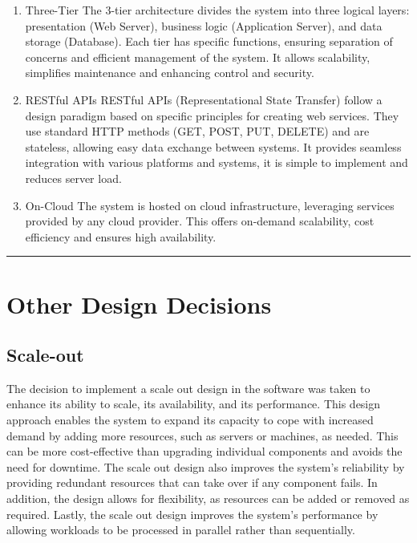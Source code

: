 \documentclass{Configuration_Files/Template}
\begin{document}
\begin{enumerate}
    \item \textcolor{bluepoli}{Three-Tier} The 3-tier architecture divides the system into three logical layers: presentation (Web Server), business logic (Application Server), and data storage (Database). Each tier has specific functions, ensuring separation of concerns and efficient management of the system. It allows scalability, simplifies maintenance and enhancing control and security. 
    \item \textcolor{bluepoli}{RESTful APIs} RESTful APIs (Representational State Transfer) follow a design paradigm based on specific principles for creating web services. They use standard HTTP methods (GET, POST, PUT, DELETE) and are stateless, allowing easy data exchange between systems. It provides seamless integration with various platforms and systems, it is simple to implement and reduces server load.
    \item \textcolor{bluepoli}{On-Cloud} The system is hosted on cloud infrastructure, leveraging services provided by any cloud provider. This offers on-demand scalability, cost efficiency and ensures high availability.
\end{enumerate}

{\color{bluepoli}\rule{\linewidth}{0.1pt}}

\section{Other Design Decisions}

\subsection{Scale-out} 

The decision to implement a scale out design in the software was taken to enhance its ability to scale, its availability, and its performance. This design approach enables the system to expand its capacity to cope with increased demand by adding more resources, such as servers or machines, as needed. This can be more cost-effective than upgrading individual components and avoids the need for downtime. The scale out design also improves the system’s reliability by providing redundant resources that can take over if
any component fails. In addition, the design allows for flexibility, as resources can be added or removed as required. Lastly, the scale out design improves the system’s performance by allowing workloads to be processed in parallel rather than sequentially.
\end{document}
